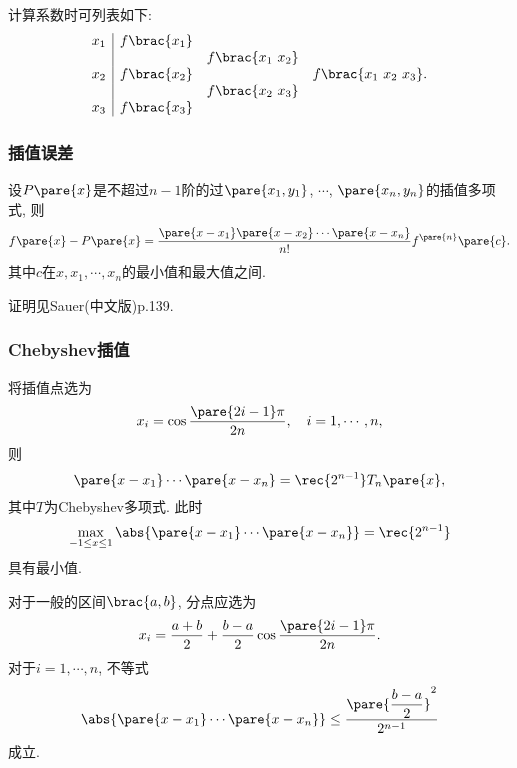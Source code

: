 \documentclass{ctexart}
\begin{document}
计算系数时可列表如下:
\[ \begin{array}{c|ccc}
    x_1 & f\brac{x_1} \\
    & & f\brac{x_1\ x_2} \\
    x_2 & f\brac{x_2} & & f\brac{x_1\ x_2\ x_3}. \\
    & & f\brac{x_2\ x_3} \\
    x_3 & f\brac{x_3}
\end{array} \]


\subsubsection{插值误差} %
\label{ssub:插值误差}

\begin{theorem}
    设$P\pare{x}$是不超过$n-1$阶的过$\pare{x_1,y_1}$, $\cdots$, $\pare{x_n,y_n}$的插值多项式, 则
    \[ f\pare{x} - P\pare{x} = \frac{\pare{x-x_1}\pare{x-x_2}\cdots\pare{x-x_n}}{n!}f^{\pare{n}}\pare{c}. \]
    其中$c$在$x,x_1,\cdots,x_n$的最小值和最大值之间.
\end{theorem}
\begin{hardlink}
    证明见Sauer(中文版)p.139.
\end{hardlink}


\subsubsection{Chebyshev插值} %
\label{ssub:chebyshev插值}

\begin{theorem}
    将插值点选为
    \[ x_i = \cos \frac{\pare{2i-1}\pi}{2n},\quad i = 1,\cdots, n, \]
    则
    \[ \pare{x-x_1}\cdots\pare{x-x_n} = \rec{2^{n-1}}T_n\pare{x}, \]
    其中$T$为Chebyshev多项式. 此时
    \[ \max_{-1\le x\le 1}\abs{\pare{x-x_1}\cdots\pare{x-x_n}} = \rec{2^{n-1}} \]
    具有最小值.
\end{theorem}
\begin{corollary}
    对于一般的区间$\brac{a,b}$, 分点应选为
    \[ x_i = \frac{a+b}{2} + \frac{b-a}{2} \cos \frac{\pare{2i-1}\pi}{2n}. \]
    对于$i=1,\cdots,n$, 不等式
    \[ \abs{\pare{x-x_1}\cdots\pare{x-x_n}} \le \frac{\displaystyle \pare{\frac{b-a}{2}}^2}{2^{n-1}} \]
    成立.
\end{corollary}

\end{document}
